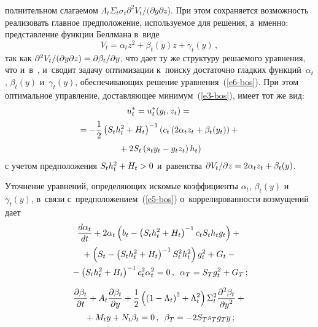 \begin{multicols}{2}
\noindent
полнительном слагаемом $\Lambda_t 
\Sigma_t \sigma_t \partial^2 V_t/(\partial y\partial z$). При этом сохраняется 
возможность реализовать главное предположение, используемое для 
решения, а~именно: пред\-став\-ле\-ние функ\-ции Беллмана в~виде
     \begin{equation}
     V_t=\alpha_t z^2 +\beta_t(y) z+\gamma_t (y)\,,
     \label{e7-bos}
\end{equation}
так как $\partial^2 V_t/(\partial y\partial z)\hm= \partial \beta_t/\partial y$, что 
дает ту же структуру решаемого уравнения, что и~в~\cite{1-bos}, и~сводит 
задачу оптимизации к~поиску достаточно гладких функций~$\alpha_t$, 
$\beta_t(y)$ и~$\gamma_t(y)$, обеспечивающих решение  
уравнения~(\ref{e6-bos}). При этом оптимальное управ\-ле\-ние, доставляющее 
минимум~(\ref{e3-bos}), имеет тот же вид:
\begin{multline}
u_t^*=u_t^*(y_t,z_t)={}\\
{}=-\displaystyle\frac{\displaystyle 1\mathstrut}{\displaystyle 2\mathstrut}\left( S_t h_t^2+H_t\right)^{-1} \left( c_t \left( 
2\alpha_t z_t +\beta_t(y_t)\right)+{}\right.\\
\left.{}+2S_t \left( s_t y_t -g_t z_t\right)h_t\right)
\label{e8-bos}
\end{multline}
с учетом предположения $S_t h_t^2\hm+H_t\hm>0$ и~равенства $\partial 
V_t/\partial z \hm= 2\alpha_t z_t+\beta_t(y)$. 

     Уточнение уравнений, определяющих искомые коэффициенты 
$\alpha_t$, $\beta_t(y)$ и~$\gamma_t(y)$, в~связи  
с~предположением~(\ref{e5-bos}) о~коррелированности возмущений дает
     \begin{multline}
     \displaystyle\frac{\displaystyle d\alpha_t\mathstrut}{\displaystyle dt\mathstrut}+2\alpha_t \left( b_t -\left( S_t h_t^2 +H_t\right)^{-1} c_t 
S_t h_t g_t\right) +{}\\
     {}+\left( S_t -\left( S_t h_t^2 + H_t\right)^{-1} S_t^2 h_t^2\right) g_t^2+G_t-{}\\
     {} -\left( S_t h_t^2 +H_t\right)^{-1} c_t^2 \alpha_t^2 = 0\,,\enskip 
\alpha_T=S_T g_t^2+G_T\,;
     \label{e9-bos}
     \end{multline}
     
     \vspace*{-12pt}
     
     \noindent
     \begin{multline}
     \displaystyle\frac{\displaystyle \partial \beta_t\mathstrut}{\displaystyle \partial t\mathstrut} +A_t\displaystyle\frac{\displaystyle \partial \beta_t\mathstrut}{\displaystyle \partial y\mathstrut} 
+\displaystyle\frac{\displaystyle 1\mathstrut}{\displaystyle 2\mathstrut}\left( \left( 1-\Lambda_t\right)^2 +\Lambda_t^2\right) 
\Sigma_t^2 \displaystyle\frac{\displaystyle \partial^2\beta_t\mathstrut}{\displaystyle \partial y^2\mathstrut}+{}\\
     {}+M_t y+N_t\beta_t =0\,,\enskip \beta_T=-2S_T s_T g_T y\,;
     \label{e10-bos}
     \end{multline}
     

\end{multicols}

